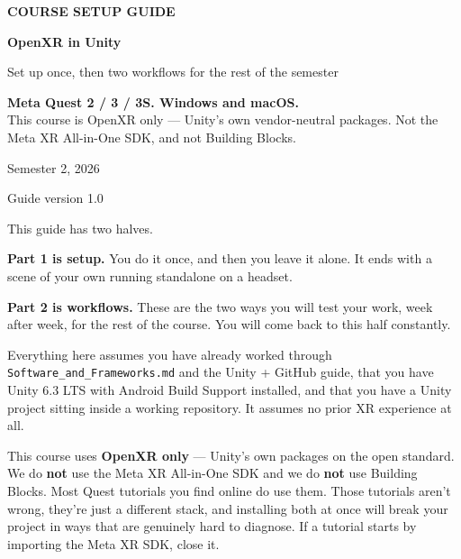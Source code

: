 \documentclass[11pt,a4paper]{article}
\begin{document}
\begin{titlepage}
\pagecolor{Ink}
\color{white}
\vspace*{42mm}
{\fontsize{14}{17}\selectfont\bfseries COURSE SETUP GUIDE\par}
\vspace{7mm}
{\fontsize{34}{39}\selectfont\bfseries OpenXR in Unity\par}
\vspace{5mm}
{\fontsize{17}{22}\selectfont Set up once, then two workflows for the rest of the
semester\par}
\vspace{16mm}
\begin{tcolorbox}[colback=white!8!Ink,colframe=white!18!Ink,boxrule=.6pt,arc=2mm]
\color{white}
\textbf{Meta Quest 2 / 3 / 3S. Windows and macOS.}\\[2mm]
This course is OpenXR only — Unity's own vendor-neutral packages. Not the Meta XR
All-in-One SDK, and not Building Blocks.
\end{tcolorbox}
\vfill
{\large Semester 2, 2026\par}
\vspace{4mm}
{\small\color{Rule}Guide version 1.0\par}
\end{titlepage}
\nopagecolor
\color{Ink}

\tableofcontents
\clearpage

This guide has two halves.

\textbf{Part 1 is setup.} You do it once, and then you leave it alone. It ends with a scene of
your own running standalone on a headset.

\textbf{Part 2 is workflows.} These are the two ways you will test your work, week after week,
for the rest of the course. You will come back to this half constantly.

Everything here assumes you have already worked through \texttt{Software\_and\_Frameworks.md} and
the Unity + GitHub guide, that you have Unity 6.3 LTS with Android Build Support
installed, and that you have a Unity project sitting inside a working repository. It
assumes no prior XR experience at all.

\begin{warnbox}
This course uses \textbf{OpenXR only} --- Unity's own
packages on the open standard. We do \textbf{not} use the Meta XR All-in-One SDK and we do
\textbf{not} use Building Blocks. Most Quest tutorials you find online do use them. Those
tutorials aren't wrong, they're just a different stack, and installing both at once
will break your project in ways that are genuinely hard to diagnose. If a tutorial
starts by importing the Meta XR SDK, close it.
\end{warnbox}
\end{document}
